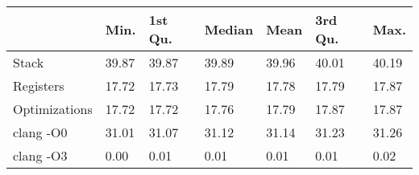 \begin{table}[ht]
\centering
\begin{tabular}{p{}p{}p{}p{}p{}p{}p{}}
  \hline
 & Min. & 1st Qu. & Median & Mean & 3rd Qu. & Max. \\ 
  \hline
Stack & 39.87 & 39.87 & 39.89 & 39.96 & 40.01 & 40.19 \\ 
  Registers & 17.72 & 17.73 & 17.79 & 17.78 & 17.79 & 17.87 \\ 
  Optimizations & 17.72 & 17.72 & 17.76 & 17.79 & 17.87 & 17.87 \\ 
  clang -O0 & 31.01 & 31.07 & 31.12 & 31.14 & 31.23 & 31.26 \\ 
  clang -O3 & 0.00 & 0.01 & 0.01 & 0.01 & 0.01 & 0.02 \\ 
   \hline
\end{tabular}
\end{table}
